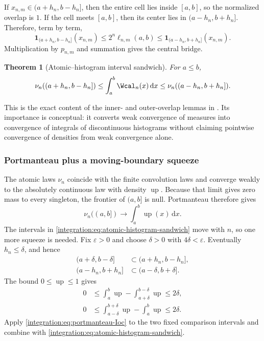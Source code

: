 \documentclass[11pt,oneside]{article}
\newtheorem{theorem}{Theorem}[section]
\theoremstyle{definition}
\theoremstyle{remark}
\newcommand{\Up}{\operatorname{up}}
\newcommand{\dd}{\,\mathrm d}
\begin{document}
If $x_{n,m}\in(a+h_n,b-h_n]$, then the entire cell lies inside $[a,b]$, so the normalized
overlap is $1$.  If the cell meets $[a,b]$, then its center lies in
$(a-h_n,b+h_n]$.  Therefore, term by term,
\begin{equation}
 \mathbf1_{(a+h_n,b-h_n]}(x_{n,m})
 \le2^n\ell_{n,m}(a,b)
 \le\mathbf1_{(a-h_n,b+h_n]}(x_{n,m}).
 \label{integration:eq:overlap-indicator-sandwich}
\end{equation}
Multiplication by $p_{n,m}$ and summation gives the central bridge.

\begin{theorem}[Atomic--histogram interval sandwich]
\label{integration:thm:atomic-histogram-sandwich}
For $a\le b$,
\begin{equation}
 \nu_n((a+h_n,b-h_n])
 \le\int_a^b\Wcal_n(x)\dd x
 \le\nu_n((a-h_n,b+h_n]).
 \label{integration:eq:atomic-histogram-sandwich}
\end{equation}
\end{theorem}

This is the exact content of the inner- and outer-overlap lemmas in
.  Its importance is conceptual: it converts weak convergence
of measures into convergence of integrals of discontinuous histograms without claiming
pointwise convergence of densities from weak convergence alone.

\subsubsection{Portmanteau plus a moving-boundary squeeze}

The atomic laws $\nu_n$ coincide with the finite convolution laws and converge weakly to the
absolutely continuous law with density $\Up$.  Because that limit gives zero mass to every
singleton, the frontier of $(a,b]$ is null.  Portmanteau therefore gives
\begin{equation}
 \nu_n((a,b])\longrightarrow\int_a^b\Up(x)\dd x.
 \label{integration:eq:portmanteau-Ioc}
\end{equation}
The intervals in \eqref{integration:eq:atomic-histogram-sandwich} move with $n$, so one more squeeze is
needed.  Fix $\varepsilon>0$ and choose $\delta>0$ with $4\delta<\varepsilon$.  Eventually
$h_n\le\delta$, and hence
\begin{align}
 (a+\delta,b-\delta]&\subset(a+h_n,b-h_n],                 \label{integration:eq:fixed-inner-subset}\\
 (a-h_n,b+h_n]&\subset(a-\delta,b+\delta].                 \label{integration:eq:moving-outer-subset}
\end{align}
The bound $0\le\Up\le1$ gives
\begin{align}
 0&\le\int_a^b\Up-\int_{a+\delta}^{b-\delta}\Up\le2\delta, \label{integration:eq:up-shrink-error}\\
 0&\le\int_{a-\delta}^{b+\delta}\Up-\int_a^b\Up\le2\delta. \label{integration:eq:up-expand-error}
\end{align}
Apply \eqref{integration:eq:portmanteau-Ioc} to the two fixed comparison intervals and combine with
\eqref{integration:eq:atomic-histogram-sandwich}.
\end{document}
